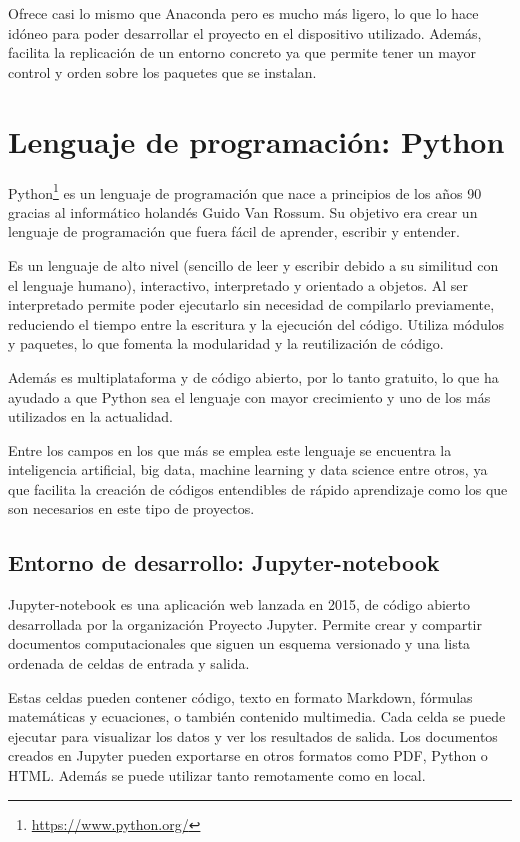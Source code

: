 \documentclass[a4paper, 12pt]{book}
\begin{document}
Ofrece casi lo mismo que Anaconda pero es mucho más ligero, lo que lo hace idóneo para poder desarrollar el proyecto en el dispositivo utilizado. Además, facilita la replicación de un entorno concreto ya que permite tener un mayor control y orden sobre los paquetes que se instalan. 

\section{Lenguaje de programación: Python}
\label{sec:lenguaje_de_programación}

Python\footnote{\url{https://www.python.org/}} es un lenguaje de programación que nace a principios de los años 90 gracias al informático holandés Guido Van Rossum. Su objetivo era crear un lenguaje de programación que fuera fácil de aprender, escribir y entender.

Es un lenguaje de alto nivel (sencillo de leer y escribir debido a su similitud con el lenguaje humano), interactivo, interpretado y orientado a objetos. Al ser interpretado permite poder ejecutarlo sin necesidad de compilarlo previamente, reduciendo el tiempo entre la escritura y la ejecución del código. Utiliza módulos y paquetes, lo que fomenta la modularidad y la reutilización de código. 

Además es multiplataforma y de código abierto, por lo tanto gratuito, lo que ha ayudado a que Python sea el lenguaje con mayor crecimiento y uno de los más utilizados en la actualidad.  

Entre los campos en los que más se emplea este lenguaje se encuentra la inteligencia artificial, big data, machine learning y data science entre otros, ya que facilita la creación de códigos entendibles de rápido aprendizaje como los que son necesarios en este tipo de proyectos.

\subsection{Entorno de desarrollo: Jupyter-notebook}
\label{subsec:entorno_de_desarrollo}

Jupyter-notebook es una aplicación web lanzada en 2015, de código abierto desarrollada por la organización Proyecto Jupyter. Permite crear y compartir documentos computacionales que siguen un esquema versionado y una lista ordenada de celdas de entrada y salida.

Estas celdas pueden contener código, texto en formato Markdown, fórmulas matemáticas y ecuaciones, o también contenido multimedia. Cada celda se puede ejecutar para visualizar los datos y ver los resultados de salida. Los documentos creados en Jupyter pueden exportarse en otros formatos como PDF, Python o HTML. Además se puede utilizar tanto remotamente como en local.
\end{document}
